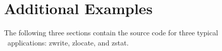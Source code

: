
















%
%

\appendix


\newpage\section{Additional Examples}

The following three sections contain the source code for three typical
\Zephyr\ applications: zwrite, zlocate, and zstat.


\newpage
\newpage



%	






